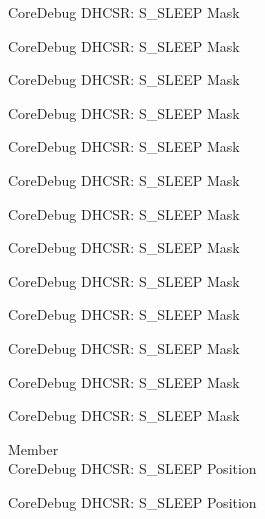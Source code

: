 \begin{DoxyRefList}
\label{deprecated__deprecated000255}%
%
Core\+Debug DHCSR\+: S\+\_\+\+SLEEP Mask 

\label{deprecated__deprecated000312}%
%
Core\+Debug DHCSR\+: S\+\_\+\+SLEEP Mask 

\label{deprecated__deprecated000388}%
%
Core\+Debug DHCSR\+: S\+\_\+\+SLEEP Mask 

\label{deprecated__deprecated000475}%
%
Core\+Debug DHCSR\+: S\+\_\+\+SLEEP Mask 

\label{deprecated__deprecated000577}%
%
Core\+Debug DHCSR\+: S\+\_\+\+SLEEP Mask 

\label{deprecated__deprecated000683}%
%
Core\+Debug DHCSR\+: S\+\_\+\+SLEEP Mask 

\label{deprecated__deprecated000775}%
%
Core\+Debug DHCSR\+: S\+\_\+\+SLEEP Mask 

\label{deprecated__deprecated000829}%
%
Core\+Debug DHCSR\+: S\+\_\+\+SLEEP Mask 

\label{deprecated__deprecated000914}%
%
Core\+Debug DHCSR\+: S\+\_\+\+SLEEP Mask 

\label{deprecated__deprecated000971}%
%
Core\+Debug DHCSR\+: S\+\_\+\+SLEEP Mask 

\label{deprecated__deprecated001047}%
%
Core\+Debug DHCSR\+: S\+\_\+\+SLEEP Mask 

\label{deprecated__deprecated001134}%
%
Core\+Debug DHCSR\+: S\+\_\+\+SLEEP Mask 

\label{deprecated__deprecated001236}%
%
Core\+Debug DHCSR\+: S\+\_\+\+SLEEP Mask  
\item[Member \doxylink{group___c_m_s_i_s___core_debug_ga349ccea33accc705595624c2d334fbcb}{Core\+Debug\+\_\+\+DHCSR\+\_\+\+S\+\_\+\+SLEEP\+\_\+\+Pos} ]\hfill \\
\label{deprecated__deprecated000023}%
%
Core\+Debug DHCSR\+: S\+\_\+\+SLEEP Position 

\label{deprecated__deprecated000115}%
%
Core\+Debug DHCSR\+: S\+\_\+\+SLEEP Position 


\end{DoxyRefList}
